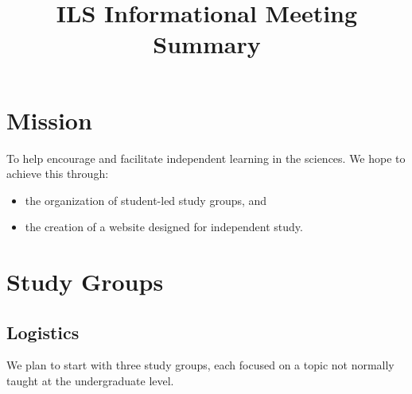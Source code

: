 \documentclass[mpinclude=true]{scrartcl}
\title{ILS Informational Meeting Summary}
\begin{document}
\maketitle
%   


\tableofcontents
\pagestyle{headings}

\section{Mission}


To help encourage and facilitate independent learning in the sciences.
We hope to achieve this through:

\begin{itemize}
\item the organization of student-led study groups, and
\item the creation of a website designed for independent study.
\end{itemize}

\section{Study Groups}


\subsection{Logistics}


We plan to start with three study groups, each focused on a topic not
normally taught at the undergraduate level.
\end{document}
